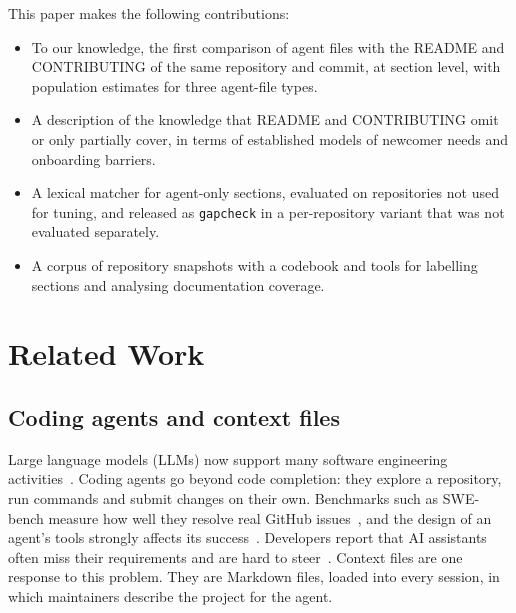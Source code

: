 \documentclass[sigconf,nonacm]{acmart}
\begin{document}
\noindent This paper makes the following contributions:
\begin{itemize}
\item To our knowledge, the first comparison of agent files with the README and CONTRIBUTING of the
same repository and commit, at section level, with population estimates for three agent-file types.
\item A description of the knowledge that README and CONTRIBUTING omit or only partially cover, in
terms of established models of newcomer needs and onboarding barriers.
\item A lexical matcher for agent-only sections, evaluated on repositories not used for tuning, and
released as \texttt{gapcheck} in a per-repository variant that was not evaluated separately.
\item A corpus of repository snapshots with a codebook and tools for labelling sections and
analysing documentation coverage.
\end{itemize}

\section{Related Work}\label{sec:related}

\subsection{Coding agents and context files}

Large language models (LLMs) now support many software engineering
activities~\cite{hou2024llm4se}. Coding agents go beyond code completion: they explore a
repository, run commands and submit changes on their own. Benchmarks such as SWE-bench measure how
well they resolve real GitHub issues~\cite{jimenez2024swebench}, and the design of an agent's tools
strongly affects its success~\cite{yang2024sweagent}. Developers report that AI assistants often
miss their requirements and are hard to steer~\cite{liang2024usability}. Context files are one
response to this problem. They are Markdown files, loaded into every session, in which maintainers
describe the project for the agent.
\end{document}
